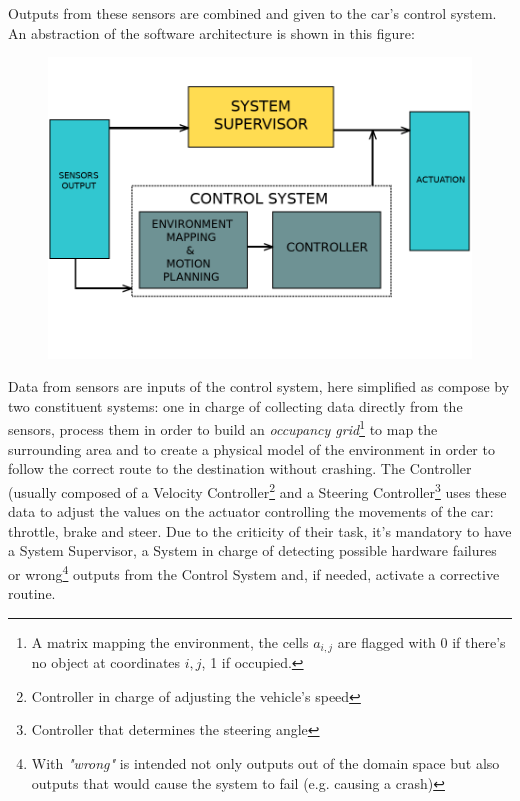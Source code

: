 Outputs from these sensors are combined and given to the car's control system.
An abstraction of the software architecture is shown in this figure:\newline\newline

\begin{figure}[h!]
	\includegraphics[width=\textwidth]{img/av-architecture.png}
\end{figure}

Data from sensors are inputs of the control system, here simplified as compose by two constituent systems: one in charge of collecting data directly from the sensors, process them in order to build an \textsl{occupancy grid}\footnote{A matrix mapping the environment, the cells $a_{i,j}$ are flagged with 0 if there's no object at coordinates $i,j$, 1 if occupied.} to map the surrounding area and to create a physical model of the environment in order to follow the correct route to the destination without crashing. The Controller (usually composed of a Velocity Controller\footnote{Controller in charge of adjusting the vehicle's speed} and a Steering Controller\footnote{Controller that determines the steering angle} uses these data to adjust the values on the actuator controlling the movements of the car: throttle, brake and steer.\newline
Due to the criticity of their task, it's mandatory to have a System Supervisor, a System in charge of detecting possible hardware failures or wrong\footnote{With \textsl{"wrong"} is intended not only outputs out of the domain space but also outputs that would cause the system to fail (e.g. causing a crash)} outputs from the Control System and, if needed, activate a corrective routine.


